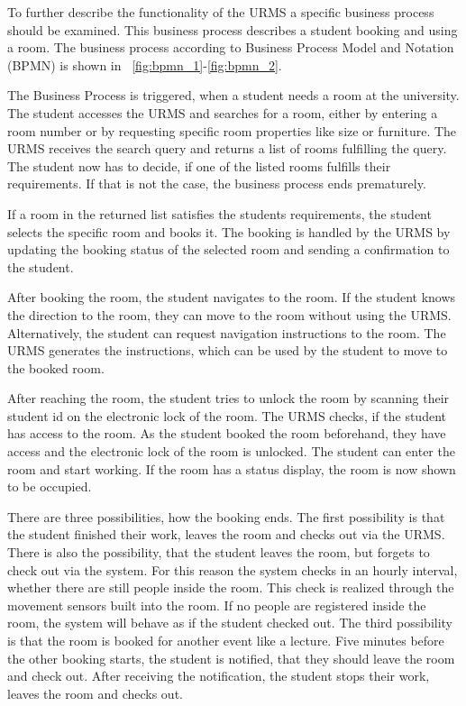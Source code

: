 \documentclass[conference,onecolumn]{IEEEtran}
\begin{document}
To further describe the functionality of the URMS a specific business process should be examined. This business process describes a student booking and using a room. The business process according to Business Process Model and Notation (BPMN) is shown in \figurename~\ref{fig:bpmn_1}-\ref{fig:bpmn_2}.

The Business Process is triggered, when a student needs a room at the university.
The student accesses the URMS and searches for a room, either by entering a room number or by requesting specific room properties like size or furniture.
The URMS receives the search query and returns a list of rooms fulfilling the query.
The student now has to decide, if one of the listed rooms fulfills their requirements. If that is not the case, the business process ends prematurely.

If a room in the returned list satisfies the students requirements, the student selects the specific room and books it.
The booking is handled by the URMS by updating the booking status of the selected room and sending a confirmation to the student.

After booking the room, the student navigates to the room.
If the student knows the direction to the room, they can move to the room without using the URMS.
Alternatively, the student can request navigation instructions to the room. The URMS generates the instructions, which can be used by the student to move to the booked room.

After reaching the room, the student tries to unlock the room by scanning their student id on the electronic lock of the room.
The URMS checks, if the student has access to the room. As the student booked the room beforehand, they have access and the electronic lock of the room is unlocked.
The student can enter the room and start working.
If the room has a status display, the room is now shown to be occupied.

There are three possibilities, how the booking ends.
The first possibility is that the student finished their work, leaves the room and checks out via the URMS.
There is also the possibility, that the student leaves the room, but forgets to check out via the system. For this reason the system checks in an hourly interval, whether there are still people inside the room. This check is realized through the movement sensors built into the room. If no people are registered inside the room, the system will behave as if the student checked out.
The third possibility is that the room is booked for another event like a lecture.
Five minutes before the other booking starts, the student is notified, that they should leave the room and check out. After receiving the notification, the student stops their work, leaves the room and checks out.
\end{document}
